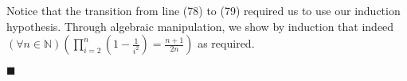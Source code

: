 \documentclass[12pt]{article}
\begin{document}
Notice that the transition from line (78) to (79) required us to use our induction hypothesis. Through algebraic manipulation, we show by induction that indeed $(\forall n \in \mathbb{N}) \left(\prod_{i=2}^{n}\left(1-\frac{1}{i^2}\right)=\frac{n+1}{2n}\right)$ as required. 
\begin{flushright}
$\blacksquare$
\end{flushright}
\end{document}

